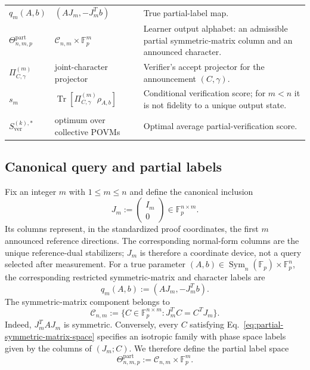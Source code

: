 \documentclass[11pt]{article}
\newcommand{\F}{\mathbb F}
\newcommand{\Sym}{\operatorname{Sym}}
\newcommand{\Tr}{\operatorname{Tr}}
\newcommand{\1}{\mathbf 1}
\theoremstyle{plain}
\theoremstyle{definition}
\theoremstyle{remark}
\begin{document}
\begin{table}[t]
\begin{tabularx}{\textwidth}{@{}l l Y@{}}
$q_m(A,b)$ & $(AJ_m,-J_m^Tb)$ & True partial-label map. \\
$\Theta_{n,m,p}^{\mathrm{part}}$ & $\mathcal C_{n,m}\times\F_p^m$ & Learner output alphabet: an admissible partial symmetric-matrix column and an announced character. \\
$\Pi_{C,\gamma}^{(m)}$ & joint-character projector & Verifier's accept projector for the announcement $(C,\gamma)$. \\
$s_m$ & $\Tr[\Pi_{C,\gamma}^{(m)}\rho_{A,b}]$ & Conditional verification score; for $m<n$ it is not fidelity to a unique output state. \\
$S_{\mathrm{ver}}^{(k),*}$ & optimum over collective POVMs & Optimal average partial-verification score. \\
\bottomrule
\end{tabularx}
\end{table}
\subsection{Canonical query and partial labels}
\label{subsec:canonical-partial-query}

Fix an integer $m$ with $1\leq m\leq n$ and define the canonical inclusion
\begin{equation}
 J_m:=\begin{pmatrix}I_m\\0\end{pmatrix}
 \in\F_p^{n\times m}.
 \label{eq:canonical-query-Jm}
\end{equation}
Its columns represent, in the standardized proof coordinates, the first $m$ announced reference directions.  The corresponding normal-form columns are the unique reference-dual stabilizers; $J_m$ is therefore a coordinate device, not a query selected after measurement.  For a true parameter
$(A,b)\in\Sym_n(\F_p)\times\F_p^n$, the corresponding restricted symmetric-matrix and
character labels are
\begin{equation}
 q_m(A,b):=(AJ_m,-J_m^Tb).
 \label{eq:true-partial-label-map}
\end{equation}
The symmetric-matrix component belongs to
\begin{equation}
 \mathcal C_{n,m}
 :=\{C\in\F_p^{n\times m}:J_m^TC=C^TJ_m\}.
 \label{eq:partial-symmetric-matrix-space}
\end{equation}
Indeed, $J_m^TAJ_m$ is symmetric.  Conversely, every $C$ satisfying
Eq.~\eqref{eq:partial-symmetric-matrix-space} specifies an isotropic family with phase
space labels given by the columns of $(J_m;C)$.  We therefore define the
partial label space
\begin{equation}
 \Theta_{n,m,p}^{\mathrm{part}}
 :=\mathcal C_{n,m}\times\F_p^m.
 \label{eq:partial-label-space}
\end{equation}
\end{document}
